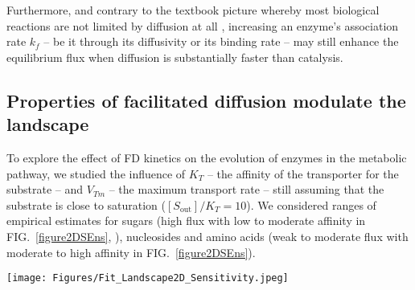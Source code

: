 \documentclass[11pt,onecolumn]{article}
\begin{document}
Furthermore, and contrary to the textbook picture whereby most biological reactions are not limited by diffusion at all \citep{Bar-Even11,Sweetlove18}, increasing an enzyme's association rate $k_f$ – be it through its diffusivity or its binding rate – may still enhance the equilibrium flux when diffusion is substantially faster than catalysis.

\subsection{Properties of facilitated diffusion modulate the landscape}

To explore the effect of FD kinetics on the evolution of enzymes in the metabolic pathway, we studied the influence of  $K_T$ -- the affinity of the transporter for the substrate -- and $V_{Tm}$ -- the maximum transport rate -- still assuming that the substrate is close to saturation ($[S_\text{out}]/K_T=10$). We considered ranges of empirical estimates for sugars (high flux with low to moderate affinity in FIG.~\ref{figure2DSEns}, \citep{Stein86d,Maier02}), nucleosides \citep{Griffith96} and amino acids \citep{Stein86d,Zampieri2019} (weak to moderate flux with moderate to high affinity in FIG.~\ref{figure2DSEns}).   

\begin{figure*}[h!]
\centering
\texttt{[image: Figures/Fit\_Landscape2D\_Sensitivity.jpeg]} 
\caption{Both the affinity and rate of a transporter have an impact on the (normalized) flux landscape for upstream enzymes, the black isocline (corresponding to $0.9$) delineates the fitness plateau. Each plot represents the landscape obtained with a pair of values for transporters affinity $K_T$ and saturation $V_{Tm}$. Moving one step to the right means that $V_{Tm}$ increases by 1.5 orders of magnitude -- from $10^{-6}$ (low flux) to $10^{-3} M.s^{-1}$ (high) -- and one step up means that $K_T$ decreases by 2 orders of magnitude, starting at $10^{-1}M$ (low affinity). Increasing $K_T$ extends the plateau only towards the left part of the landscape, allowing enzymes with lower $k_f$ on the plateau, whereas decreasing $V_{Tm}$ extends the plateau in both directions. Other parameter values: $k_r=1000/s$, $[E_{tot}]=1mM$ and $[S_{env}]=10 \times K_T$.}
\label{figure2DSEns}
\end{figure*}
\end{document}
